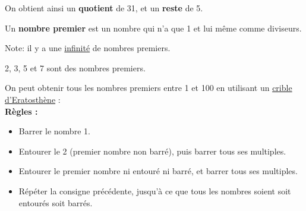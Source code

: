 \documentclass[../€Cours-complet/Cours-complet]{subfiles}
\begin{document}
\begin{exemple}
	On obtient ainsi un \textbf{quotient} de 31, et un \textbf{reste} de 5.
\end{exemple}

\begin{cours}
	Un \textbf{nombre premier} est un nombre qui n'a que 1 et lui même comme diviseurs.
\end{cours}

Note: il y a une \uline{infinité} de nombres premiers.

\begin{exemple}
	2, 3, 5 et 7 sont des nombres premiers.
\end{exemple}

\newpage

On peut obtenir tous les nombres premiers entre 1 et 100 en utilisant un \uline{crible d'Eratosthène} : \\

\textbf{Règles :}
\begin{itemize} \setlength\itemsep{0.3em}
	\item Barrer le nombre 1.
	\item Entourer le 2 (premier nombre non barré), puis barrer tous ses multiples.
	\item Entourer le premier nombre ni entouré ni barré, et barrer tous ses multiples.
	\item Répéter la consigne précédente, jusqu'à ce que tous les nombres soient soit entourés soit barrés.
\end{itemize}
\vspace{0.7cm}
\end{document}
